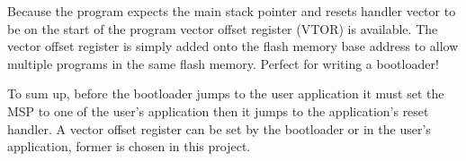 Because the program expects the main stack pointer and resets handler vector to be on the start of the program vector offset register (VTOR) is available. The vector offset register is simply added onto the flash memory base address to allow multiple programs in the same flash memory. Perfect for writing a bootloader!

To sum up, before the bootloader jumps to the user application it must set the MSP to one of the user's application then it jumps to the application's reset handler. A vector offset register can be set by the bootloader or in the user's application, former is chosen in this project.

